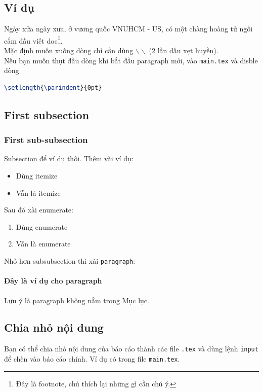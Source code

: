 \subsection{Ví dụ}
Ngày xửa ngày xưa, ở vương quốc VNUHCM - US, có một chàng hoàng tử ngồi cắm đầu viết doc\footnote{Đây là footnote, chú thích lại những gì cần chú ý.}.\\
Mặc định muốn xuống dòng chỉ cần dùng $\backslash\backslash$  (2 lần dấu xẹt huyền).\\
Nếu bạn muốn thụt đầu dòng khi bắt đầu paragraph mới, vào \texttt{main.tex} và disble dòng
\begin{lstlisting}[language=tex]
\setlength{\parindent}{0pt}
\end{lstlisting}

\subsection{First subsection}
\subsubsection{First sub-subsection}
Subsection để ví dụ thôi. Thêm vài ví dụ:
\begin{itemize}
    \item Dùng itemize
    \item Vẫn là itemize
\end{itemize}
Sau đó xài enumerate:
\begin{enumerate}
    \item Dùng enumerate
    \item Vẫn là enumerate
\end{enumerate}
Nhỏ hơn subsubsection thì xài \texttt{paragraph}:

\paragraph{Đây là ví dụ cho paragraph}
Lưu ý là paragraph không nằm trong Mục lục.

\subsection{Chia nhỏ nội dung}
Bạn có thể chia nhỏ nội dung của báo cáo thành các file \texttt{.tex} và dùng lệnh \texttt{input} để chèn vào báo cáo chính. Ví dụ có trong file \texttt{main.tex}.